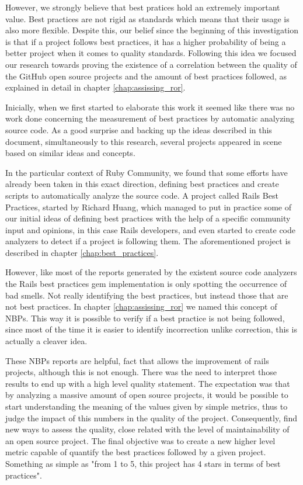 However, we strongly believe that best pratices hold an extremely important value.
Best practices are not rigid as standards which means that their usage is also more flexible.
Despite this, our belief since the beginning of this investigation is that if 
a project follows best practices, it has a higher probability of being a better project when it comes to quality standards.
Following this idea we focused our research towards proving the existence of
a correlation between the quality of the GitHub open source projects and the amount of best practices followed,
as explained in detail in chapter \ref{chap:assissing_ror}.

Inicially, when we first started to elaborate this work it seemed like there was no work done 
concerning the measurement of best practices by automatic analyzing source code.
As a good surprise and backing up the ideas described in this document, simultaneously to this research, 
several projects appeared in scene based on similar ideas and concepts.

In the particular context of Ruby Community, we found that some efforts have already been taken in this exact direction,
defining best practices and create scripts to automatically analyze the source code.
A project called Rails Best Practices, started by Richard Huang, 
which managed to put in practice some of our initial ideas of defining best practices with 
the help of a specific community input and opinions, in this case Rails developers,
and even started to create code analyzers to detect if a project is following them.
The aforementioned project is described in chapter \ref{chap:best_practices}.

However, like most of the reports generated by the existent source code analyzers
the Rails best practices gem implementation is only spotting the occurrence of bad smells.
Not really identifying the best practices, but instead those that are not best practices. 
In chapter \ref{chap:assissing_ror} we named this concept of NBPs.
This way it is possible to verify if a best practice is not being followed, 
since most of the time it is easier to identify incorrection unlike correction, 
this is actually a cleaver idea.
 
These NBPs reports are helpful, fact that allows the improvement of rails projects, although this is not enough.
There was the need to interpret those results to end up with a high level quality statement.
The expectation was that by analyzing a massive amount of open source projects, it would be possible to start understanding
the meaning of the values given by simple metrics,
thus to judge the impact of this numbers in the quality of the project. 
Consequently, find new ways to assess the quality, close related with the level of maintainability of an open source project.
The final objective was to create a new higher level metric capable of quantify the best practices followed by a given project.
Something as simple as "from 1 to 5, this project has 4 stars in terms of best practices".

